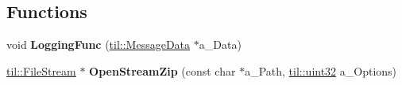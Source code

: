 \subsection*{Functions}
\begin{DoxyCompactItemize}
\item 
\hypertarget{example-zip-loading_8cpp_a99e7ccbab4f57c004bffb9c554f6bd66}{
void {\bfseries LoggingFunc} (\hyperlink{structtil_1_1_message_data}{til::MessageData} $\ast$a\_\-Data)}
\label{example-zip-loading_8cpp_a99e7ccbab4f57c004bffb9c554f6bd66}

\item 
\hypertarget{example-zip-loading_8cpp_a7028da0a7353c0db0c6c52374998d30d}{
\hyperlink{classtil_1_1_file_stream}{til::FileStream} $\ast$ {\bfseries OpenStreamZip} (const char $\ast$a\_\-Path, \hyperlink{namespacetil_a20db61688ed403d11f057a508d87e54c}{til::uint32} a\_\-Options)}
\label{example-zip-loading_8cpp_a7028da0a7353c0db0c6c52374998d30d}

\end{DoxyCompactItemize}

